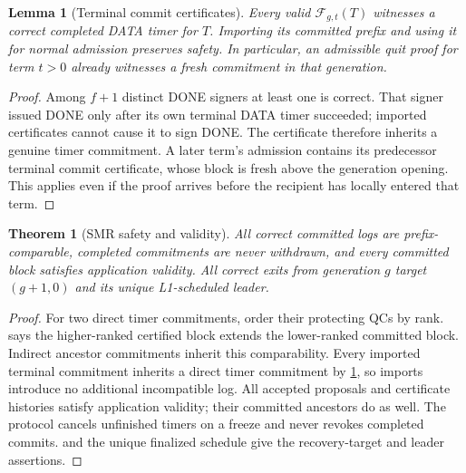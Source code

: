 \documentclass[11pt,a4paper]{article}
\newcommand{\DC}{\mathcal F}
\newtheorem{lemma}[lemma]{Lemma}
\newtheorem{theorem}[theorem]{Theorem}
\newcounter{protocol}
\begin{document}
\begin{lemma}[Terminal commit certificates]
\label{lem:done}
Every valid $\DC_{g,t}(T)$ witnesses a correct completed DATA timer for
$T$. Importing its committed prefix and using it for normal admission
preserves safety. In particular, an admissible quit proof for term $t>0$
already witnesses a fresh commitment in that generation.
\end{lemma}
\begin{proof}
Among $f+1$ distinct DONE signers at least one is correct. That signer
issued DONE only after its own terminal DATA timer succeeded; imported
certificates cannot cause it to sign DONE. The certificate therefore
inherits a genuine timer commitment. A later term's admission contains
its predecessor terminal commit certificate, whose block is fresh above
the generation opening. This applies even if the proof arrives before
the recipient has locally entered that term.
\end{proof}

\begin{theorem}[SMR safety and validity]
\label{thm:safety}
All correct committed logs are prefix-comparable, completed commitments
are never withdrawn, and every committed block satisfies application
validity. All correct exits from generation $g$ target $(g+1,0)$ and its
unique L1-scheduled leader.
\end{theorem}
\begin{proof}
For two direct timer commitments, order their protecting QCs by rank.
 says the higher-ranked certified block extends the
lower-ranked committed block. Indirect ancestor commitments inherit this
comparability. Every imported terminal commitment inherits a direct timer
commitment by \cref{lem:done}, so imports introduce no additional
incompatible log. All accepted proposals and certificate histories satisfy
application validity; their committed ancestors do as well.
The protocol cancels unfinished timers on a freeze and never revokes
completed commits.  and the unique finalized schedule
give the recovery-target and leader assertions.
\end{proof}
\end{document}
